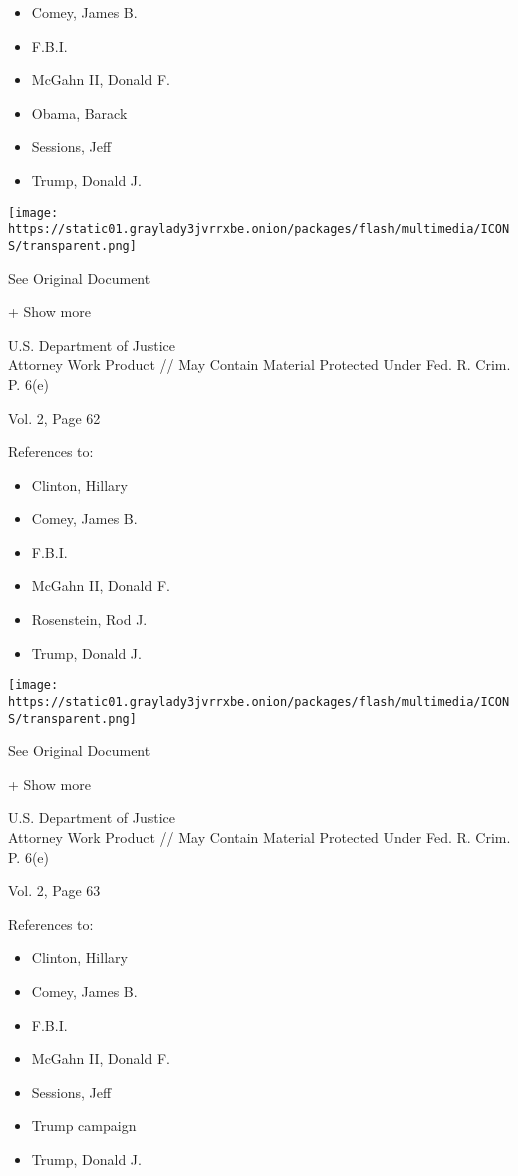\begin{itemize}
\tightlist
\item
  Comey, James B.
\item
  F.B.I.
\item
  McGahn II, Donald F.
\item
  Obama, Barack
\item
  Sessions, Jeff
\item
  Trump, Donald J.
\end{itemize}

\protect\hyperlink{}{}

\texttt{[image: https://static01.graylady3jvrrxbe.onion/packages/flash/multimedia/ICONS/transparent.png]}

See Original Document

+ Show more

U.S. Department of Justice\\
Attorney Work Product // May Contain Material Protected Under Fed. R.
Crim. P. 6(e)

Vol. 2, Page 62

References to:

\begin{itemize}
\tightlist
\item
  Clinton, Hillary
\item
  Comey, James B.
\item
  F.B.I.
\item
  McGahn II, Donald F.
\item
  Rosenstein, Rod J.
\item
  Trump, Donald J.
\end{itemize}

\protect\hyperlink{}{}

\texttt{[image: https://static01.graylady3jvrrxbe.onion/packages/flash/multimedia/ICONS/transparent.png]}

See Original Document

+ Show more

U.S. Department of Justice\\
Attorney Work Product // May Contain Material Protected Under Fed. R.
Crim. P. 6(e)

Vol. 2, Page 63

References to:

\begin{itemize}
\tightlist
\item
  Clinton, Hillary
\item
  Comey, James B.
\item
  F.B.I.
\item
  McGahn II, Donald F.
\item
  Sessions, Jeff
\item
  Trump campaign
\item
  Trump, Donald J.
\end{itemize}

